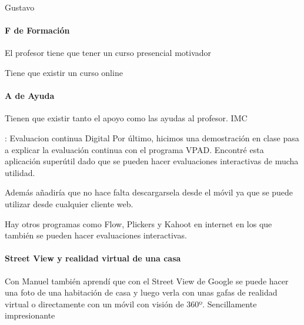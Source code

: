 \begin{opin}{\guscolor}{Gustavo}
\paragraph{F de Formación}
El profesor tiene que tener un curso presencial motivador

Tiene que existir un curso online

\paragraph{A de Ayuda}
Tienen que existir tanto el apoyo como las ayudas al profesor. IMC

: Evaluacion continua Digital
Por último, hicimos una demostración en clase pasa a explicar la evaluación continua con el programa VPAD. Encontré esta aplicación superútil dado que se pueden hacer evaluaciones interactivas de mucha utilidad.

Además añadiría que no hace falta descargarsela desde el móvil ya que se puede utilizar desde cualquier cliente web.

Hay otros programas como Flow, Plickers y Kahoot en internet en los que también se pueden hacer evaluaciones interactivas.

\paragraph{Street View y realidad virtual de una casa}
Con Manuel también aprendí que con el Street View de Google se puede hacer una foto de una habitación de casa y luego verla con unas gafas de realidad virtual o directamente con un móvil con visión de 360º. Sencillamente impresionante


\end{opin}

